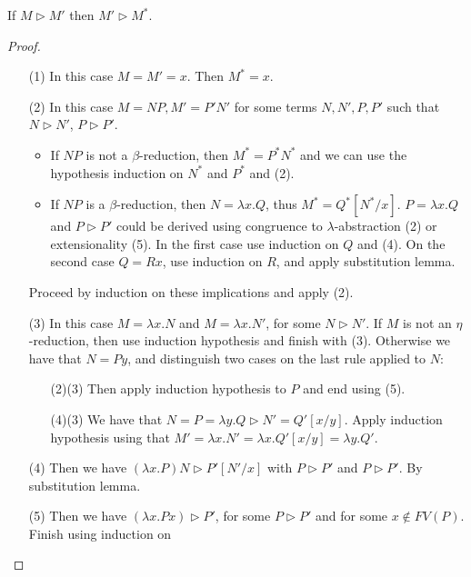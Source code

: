 \begin{lemma}\label{lemma:cr2}
  If $M\triangleright M'$ then $M'\triangleright M^*$.
\end{lemma}
\begin{proof}
  \begin{itemize}
  We proceed by induction on $M$ again:
\item[(1)] In this case $M=M'=x$. Then $M^*=x$.
\item[(2)] In this case $M=NP, M'=P'N'$ for some terms $N,N',P,P'$ such that $N\triangleright N'$, $P\triangleright P'$.
  \begin{itemize}
  \item If $NP$ is not a $\beta$-reduction, then $M^* = P^*N^*$ and we can use the hypothesis induction on $N^*$ and $P^*$ and (2).
  \item If $NP$ is a $\beta$-reduction, then $N = \lambda x. Q$, thus $M^* = Q^*[N^*/x]$. $P = \lambda x.Q$ and $P \triangleright P'$ could be derived using congruence to $\lambda$-abstraction (2) or extensionality (5). In the first case use induction on $Q$ and (4). On the second case $Q=Rx$, use induction on $R$, and apply substitution lemma.
  \end{itemize}

  Proceed by induction on these implications and apply (2).
\item[(3)] In this case $M=\lambda x.N$ and $M=\lambda x.N'$, for some $N\triangleright N'$. If $M$ is not an $\eta$-reduction, then use induction hypothesis and finish with (3). Otherwise we have that $N = Py$, and distinguish two cases on the last rule applied to $N$:
  \begin{itemize}
  \item[(2)\to (3)] Then apply induction hypothesis to $P$ and end using (5).
  \item[(4)\to (3)] We have that $N = P = \lambda y.Q \triangleright N' = Q'[x/y]$. Apply induction hypothesis using that $M ' = \lambda x.N' = \lambda x.Q'[x/y] = \lambda y. Q'$.
  \end{itemize}
\item[(4)] Then we have $(\lambda x.P)N \triangleright P'[N'/x]$ with $P \triangleright P'$ and $P \triangleright P'$. By substitution lemma.
\item[(5)] Then we have $(\lambda x.Px) \triangleright P'$, for some $P\triangleright P'$ and for some $x \not  \in FV(P)$. Finish using induction on 
\end{itemize}
\end{proof}


